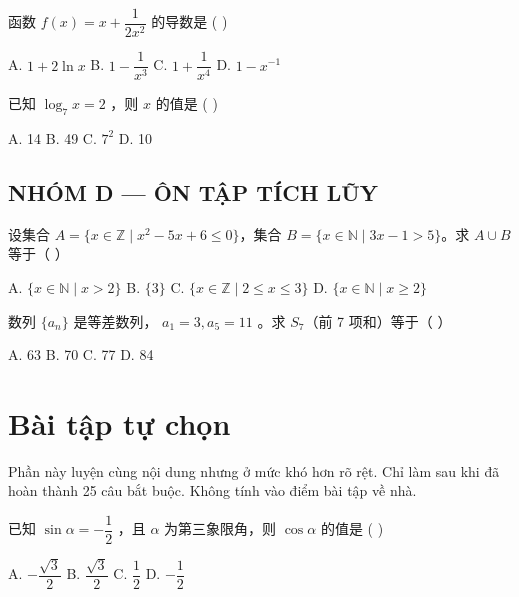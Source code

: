 \documentclass[11pt, a4paper]{article}
\begin{document}
\begin{baitap}[22]
函数 $f(x) = x + \dfrac{1}{2x^2}$ 的导数是 ( )
\par\vspace{3pt}
\noindent A. $1 + 2\ln x$ \quad B. $1 - \dfrac{1}{x^3}$ \quad C. $1 + \dfrac{1}{x^4}$ \quad D. $1 - x^{-1}$
\end{baitap}

\begin{baitap}[23]
已知 $\log_{7}x = 2$ ，则 $x$ 的值是 ( )
\par\vspace{3pt}
\noindent A. 14 \quad B. 49 \quad C. $7^2$ \quad D. 10
\end{baitap}

\subsection*{NHÓM D — ÔN TẬP TÍCH LŨY}

\begin{baitap}[24]
设集合 $A=\{x\in\mathbb{Z}\mid x^2-5x+6\le0\}$，集合 $B=\{x\in\mathbb{N}\mid 3x-1>5\}$。求 $A\cup B$ 等于（ ）
\par\vspace{3pt}
\noindent A. $\{x\in\mathbb{N}\mid x>2\}$ \quad B. $\{3\}$ \quad C. $\{x\in\mathbb{Z}\mid 2\le x\le3\}$ \quad D. $\{x\in\mathbb{N}\mid x\ge2\}$
\end{baitap}

\begin{baitap}[25]
数列 $\{a_n\}$ 是等差数列， $a_1 = 3, a_5 = 11$ 。求 $S_7$（前 7 项和）等于（ ）
\par\vspace{3pt}
\noindent A. 63 \quad B. 70 \quad C. 77 \quad D. 84
\end{baitap}

\clearpage
\section{Bài tập tự chọn}

Phần này luyện cùng nội dung nhưng ở mức khó hơn rõ rệt. Chỉ làm sau khi đã hoàn thành 25 câu bắt buộc. Không tính vào điểm bài tập về nhà.

\begin{baitap}[1]
已知 $\sin\alpha = -\dfrac{1}{2}$ ，且 $\alpha$ 为第三象限角，则 $\cos\alpha$ 的值是 ( )
\par\vspace{3pt}
\noindent A. $-\dfrac{\sqrt{3}}{2}$ \quad B. $\dfrac{\sqrt{3}}{2}$ \quad C. $\dfrac{1}{2}$ \quad D. $-\dfrac{1}{2}$
\end{baitap}
\end{document}
